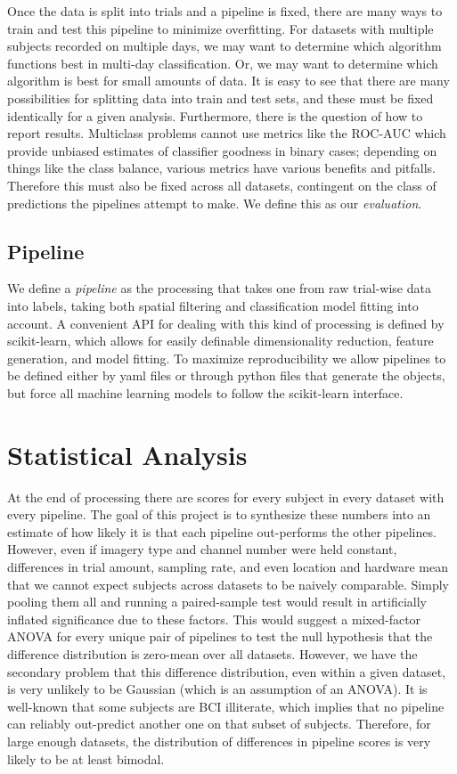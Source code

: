 Once the data is split into trials and a pipeline is fixed, there are
many ways to train and test this pipeline to minimize overfitting. For
datasets with multiple subjects recorded on multiple days, we may want
to determine which algorithm functions best in multi-day
classification. Or, we may want to determine which algorithm is best
for small amounts of data. It is easy to see that there are many
possibilities for splitting data into train and test sets, and these
must be fixed identically for a given analysis. Furthermore, there is
the question of how to report results. Multiclass problems cannot use
metrics like the ROC-AUC which provide unbiased estimates of
classifier goodness in binary cases; depending on things like the
class balance, various metrics have various benefits and
pitfalls. Therefore this must also be fixed across all datasets,
contingent on the class of predictions the pipelines attempt to
make. We define this as our \emph{evaluation}.

\subsection{Pipeline}

We define a \emph{pipeline} as the processing that takes one from raw
trial-wise data into labels, taking both spatial filtering and
classification model fitting into account. A convenient API for
dealing with this kind of processing is defined by
scikit-learn\cite{Pedregosa2011}, which allows for easily definable
dimensionality reduction, feature generation, and model fitting. To
maximize reproducibility we allow pipelines to be defined either by
yaml files or through python files that generate the objects, but
force all machine learning models to follow the scikit-learn
interface.

\section{Statistical Analysis}
\label{stats}

At the end of processing there are scores for every subject in every
dataset with every pipeline. The goal of this project is to synthesize
these numbers into an estimate of how likely it is that each pipeline
out-performs the other pipelines. However, even if imagery type and
channel number were held constant, differences in trial amount,
sampling rate, and even location and hardware mean that we cannot
expect subjects across datasets to be naively comparable. Simply
pooling them all and running a paired-sample test would result in
artificially inflated significance due to these factors. This would
suggest a mixed-factor ANOVA for every unique pair of pipelines to
test the null hypothesis that the difference distribution is zero-mean
over all datasets. However, we have the secondary problem that this
difference distribution, even within a given dataset, is very unlikely
to be Gaussian (which is an assumption of an ANOVA). It is well-known
that some subjects are BCI illiterate, which implies that no pipeline
can reliably out-predict another one on that subset of
subjects. Therefore, for large enough datasets, the distribution of
differences in pipeline scores is very likely to be at least bimodal.

